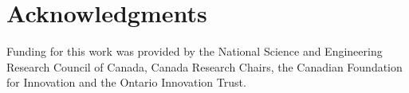\documentclass[10pt,letterpaper]{article}
\begin{document}




\section{Acknowledgments}
Funding for this work was provided by the National Science and Engineering Research Council of Canada, Canada Research Chairs, the Canadian Foundation for Innovation and the Ontario Innovation Trust.		


\setlength{\bibleftmargin}{.125in}
\setlength{\bibindent}{-\bibleftmargin}


\end{document}
